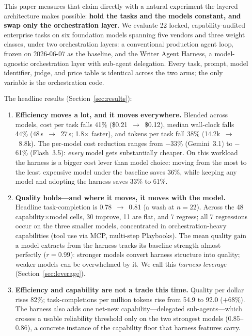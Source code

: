 \documentclass[11pt]{article}
\newcommand{\NP}{22}                    %
\newcommand{\NM}{six}                   %
\newcommand{\CostA}{\$0.21}\newcommand{\CostB}{\$0.12}\newcommand{\CostD}{41\%}
\newcommand{\LatA}{48\,s}\newcommand{\LatB}{27\,s}\newcommand{\LatD}{44\%}
\newcommand{\SpeedX}{1.8$\times$}
\newcommand{\TokA}{14.2k}\newcommand{\TokB}{8.8k}\newcommand{\TokD}{38\%}
\newcommand{\QA}{0.78}\newcommand{\QB}{0.81}
\newcommand{\QPDgain}{82\%}
\newcommand{\CPMA}{54.9}\newcommand{\CPMB}{92.0}\newcommand{\CPMgain}{68\%}
\newcommand{\CostRange}{33\% to 61\%}
\newcommand{\FreezeDate}{2026-06-07}
\begin{document}
This paper measures that claim directly with a natural experiment the layered architecture makes possible: \textbf{hold the tasks and the models constant, and swap only the orchestration layer}. We evaluate \NP{} locked, capability-audited enterprise tasks on \NM{} foundation models spanning five vendors and three weight classes, under two orchestration layers: a conventional production agent loop, frozen on \FreezeDate{} as the baseline, and the Writer Agent Harness, a model-agnostic orchestration layer with sub-agent delegation. Every task, prompt, model identifier, judge, and price table is identical across the two arms; the only variable is the orchestration code.

\medskip
\noindent The headline results (Section~\ref{sec:results}):

\begin{enumerate}[leftmargin=1.6em,itemsep=2pt]
\item \textbf{Efficiency moves a lot, and it moves everywhere.} Blended across models, cost per task falls \CostD{} (\CostA{}~$\rightarrow$~\CostB{}), median wall-clock falls \LatD{} (\LatA{}~$\rightarrow$~\LatB{}; \SpeedX{} faster), and tokens per task fall \TokD{} (\TokA{}~$\rightarrow$~\TokB{}). The per-model cost reduction ranges from $-$33\% (Gemini~3.1) to $-$61\% (Flash~3.5): \emph{every} model gets substantially cheaper. On this workload the harness is a bigger cost lever than model choice: moving from the most to the least expensive model under the baseline saves 36\%, while keeping any model and adopting the harness saves \CostRange{}.
\item \textbf{Quality holds---and where it moves, it moves with the model.} Headline task-completion is \QA{}~$\rightarrow$~\QB{} (a wash at $n=\NP$). Across the 48 capability$\times$model cells, 30 improve, 11 are flat, and 7 regress; all 7 regressions occur on the three smaller models, concentrated in orchestration-heavy capabilities (tool use via MCP, multi-step Playbooks). The mean quality gain a model extracts from the harness tracks its baseline strength almost perfectly ($r=0.99$): stronger models convert harness structure into quality; weaker models can be overwhelmed by it. We call this \emph{harness leverage} (Section~\ref{sec:leverage}).
\item \textbf{Efficiency and capability are not a trade this time.} Quality per dollar rises \QPDgain{}; task-completions per million tokens rise from \CPMA{} to \CPMB{} ($+$\CPMgain{}). The harness also adds one net-new capability---delegated sub-agents---which crosses a usable reliability threshold only on the two strongest models (0.85--0.86), a concrete instance of the capability floor that harness features carry.
\end{enumerate}
\end{document}

